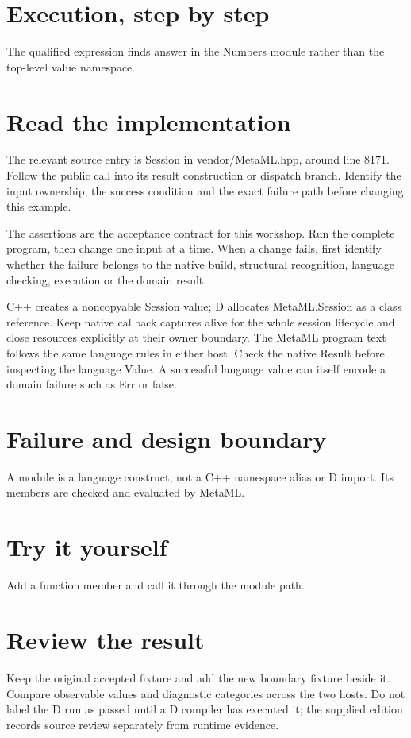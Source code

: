 
\section*{Execution, step by step}
The qualified expression finds answer in the Numbers module rather than the top-level value namespace.

\section*{Read the implementation}
The relevant source entry is Session in vendor/MetaML.hpp, around line 8171. Follow the public call into its result construction or dispatch branch. Identify the input ownership, the success condition and the exact failure path before changing this example.

The assertions are the acceptance contract for this workshop. Run the complete program, then change one input at a time. When a change fails, first identify whether the failure belongs to the native build, structural recognition, language checking, execution or the domain result.

\clearpage
{}
C++ creates a noncopyable Session value; D allocates MetaML.Session as a class reference. Keep native callback captures alive for the whole session lifecycle and close resources explicitly at their owner boundary. The MetaML program text follows the same language rules in either host. Check the native Result before inspecting the language Value. A successful language value can itself encode a domain failure such as Err or false.


\section*{Failure and design boundary}
A module is a language construct, not a C++ namespace alias or D import. Its members are checked and evaluated by MetaML.

\section*{Try it yourself}
Add a function member and call it through the module path.

\section*{Review the result}
Keep the original accepted fixture and add the new boundary fixture beside it. Compare observable values and diagnostic categories across the two hosts. Do not label the D run as passed until a D compiler has executed it; the supplied edition records source review separately from runtime evidence.

